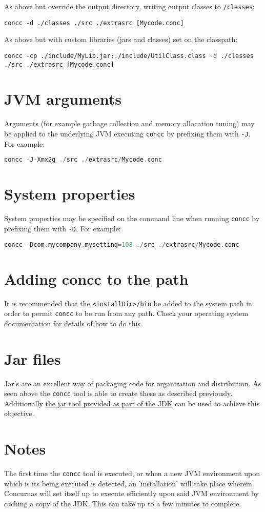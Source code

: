 \documentclass[conc-doc]{subfiles}
\begin{document}
As above but override the output directory, writing output classes to \lstinline{/classes}:
\begin{lstlisting}
concc -d ./classes ./src ./extrasrc [Mycode.conc]
\end{lstlisting}

As above but with custom libraries (jars and classes) set on the classpath:
\begin{lstlisting}
concc -cp ./include/MyLib.jar;./include/UtilClass.class -d ./classes ./src ./extrasrc [Mycode.conc]
\end{lstlisting}

\section{JVM arguments}
Arguments (for example garbage collection and memory allocation tuning) may be applied to the underlying JVM executing \lstinline{concc} by prefixing them with \lstinline{-J}. For example:

\begin{lstlisting}[language=C]
concc -J-Xmx2g ./src ./extrasrc/Mycode.conc
\end{lstlisting}

\section{System properties}
System properties may be specified on the command line when running \lstinline{concc} by prefixing them with \lstinline{-D}. For example:

\begin{lstlisting}[language=C]
concc -Dcom.mycompany.mysetting=108 ./src ./extrasrc/Mycode.conc
\end{lstlisting}

\section{Adding concc to the path}
It is recommended that the \lstinline{<installDir>/bin} be added to the system path in order to permit \lstinline{concc} to be run from any path. Check your operating system documentation for details of how to do this.

\section{Jar files}
Jar’s are an excellent way of packaging code for organization and distribution. As seen above the \lstinline{concc} tool is able to create these as described previously. Additionally \href{https://docs.oracle.com/javase/tutorial/deployment/jar/build.html}{the jar tool provided as part of the JDK} can be used to achieve this objective.

\section{Notes}
The first time the \lstinline{concc} tool is executed, or when a new JVM environment upon which is its being executed is detected, an 'installation' will take place wherein Concurnas will set itself up to execute efficiently upon said JVM environment by caching a copy of the JDK. This can take up to a few minutes to complete.
\end{document}
